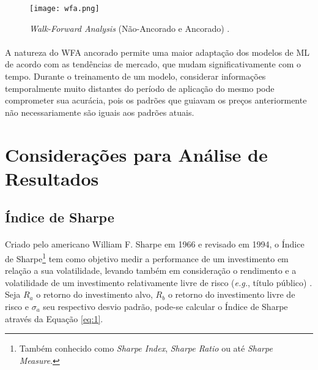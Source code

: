 \begin{figure}[h]
    \texttt{[image: wfa.png]}
    \centering
    \caption{\textit{Walk-Forward Analysis} (Não-Ancorado e Ancorado) \cite{wfo}.}
    \label{fig:10}
\end{figure}

\paragraph{} A natureza do WFA ancorado permite uma maior adaptação dos modelos de ML de acordo com as tendências de mercado, que mudam significativamente com o tempo. Durante o treinamento de um modelo, considerar informações temporalmente muito distantes do período de aplicação do mesmo pode comprometer sua acurácia, pois os padrões que guiavam os preços anteriormente não necessariamente são iguais aos padrões atuais.



\FloatBarrier
\section{Considerações para Análise de Resultados}



\FloatBarrier
\subsection{Índice de Sharpe}

\paragraph{} Criado pelo americano William F. Sharpe em 1966 e revisado em 1994, o Índice de Sharpe\footnote{Também conhecido como \textit{Sharpe Index}, \textit{Sharpe Ratio} ou até \textit{Sharpe Measure}.} tem como objetivo medir a performance de um investimento em relação a sua volatilidade, levando também em consideração o rendimento e a volatilidade de um investimento relativamente livre de risco (\textit{e.g.}, título público) \cite{sharpe1998sharpe}. Seja \begin{math}R_a\end{math} o retorno do investimento alvo, \begin{math}R_b\end{math} o retorno do investimento livre de risco e \begin{math}\sigma_a\end{math} seu respectivo desvio padrão, pode-se calcular o Índice de Sharpe através da Equação \ref{eq:1}.

